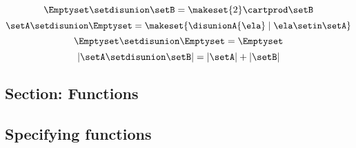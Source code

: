 \begin{forslides}
\begin{equation}
        \Emptyset \setdisunion \setB =  \makeset{2} \cartprod \setB
    \end{equation}
    \begin{equation}
        \label{eq:slides_session2_73}
        \setA \setdisunion \Emptyset =  \makeset{ \disunionA{\ela} \mid \ela \setin\setA }
    \end{equation}
    \begin{equation}
        \label{eq:slides_session2_74}
        \Emptyset \setdisunion \Emptyset = \Emptyset
    \end{equation}
    \begin{equation}
        \label{eq:slides_session2_75}
        \vert \setA \setdisunion \setB \vert = \vert \setA \vert + \vert \setB \vert
    \end{equation}

    \subsection{Section: Functions}

    \subsection{Specifying functions}


\end{forslides}

